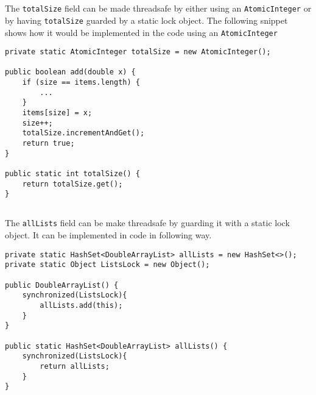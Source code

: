 \documentclass{ituhandin}
\begin{document}
\chapter{} %
\section{}
The \texttt{totalSize} field can be made threadsafe by either using an \texttt{AtomicInteger} or by having \texttt{totalSize} guarded by a static lock object. The following snippet shows how it would be implemented in the code using an \texttt{AtomicInteger}

\begin{lstlisting}[frame={}]
private static AtomicInteger totalSize = new AtomicInteger();

public boolean add(double x) {
    if (size == items.length) {
        ...
    }
    items[size] = x;
    size++;
    totalSize.incrementAndGet();
    return true;
}

public static int totalSize() {
    return totalSize.get();
}
\end{lstlisting}

\section{}
The \texttt{allLists} field can be make threadsafe by guarding it with a static lock object. It can be implemented in code in following way.
\begin{lstlisting}[frame={}]
private static HashSet<DoubleArrayList> allLists = new HashSet<>();
private static Object ListsLock = new Object();

public DoubleArrayList() {
    synchronized(ListsLock){
        allLists.add(this);
    }
}

public static HashSet<DoubleArrayList> allLists() {
    synchronized(ListsLock){
        return allLists;
    }
}
\end{lstlisting}

\chapter{} %
\end{document}
